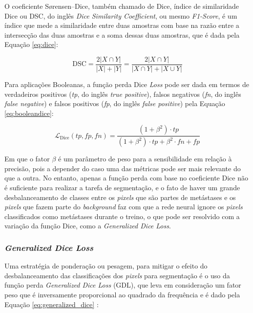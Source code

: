 O coeficiente S{\o}rensen–Dice, também chamado de Dice, índice de similaridade Dice ou DSC, do inglês \textit{Dice Similarity Coefficient}, ou mesmo \textit{F1-Score}, é um índice que mede a similaridade entre duas amostras com base na razão entre a intersecção das duas amostras e a soma dessas duas amostras, que é dada pela Equação \ref{eq:dice}:

\begin{equation}\label{eq:dice}
    \text{DSC} = \frac{2|X \cap Y|}{|X| + |Y|} = \frac{2|X \cap Y|}{|X \cap Y| + |X \cup Y|}
\end{equation}

Para aplicações Booleanas, a função perda Dice \textit{Loss} pode ser dada  em termos de verdadeiros positivos  (\textit{tp}, do inglês \textit{true positive}), falsos negativos (\textit{fn}, do inglês \textit{false negative}) e falsos positivos (\textit{fp}, do inglês \textit{false positive}) pela Equação \ref{eq:booleandice}:

\begin{equation}\label{eq:booleandice}
    \mathcal{L}_{\text{Dice}}(tp, fp, fn) = \frac{(1 + \beta^2) \cdot tp} {(1 + \beta^2) \cdot tp + \beta^2 \cdot fn + fp}
\end{equation}

Em que o fator $\beta$ é um parâmetro de peso para a sensibilidade em relação à precisão, pois a depender do caso uma das métricas pode ser mais relevante do que a outra. No entanto, apenas a função perda com base no coeficiente Dice não é suficiente para realizar a tarefa de segmentação, e o fato de haver um grande desbalanceamento de classes entre os \textit{pixels} que são partes de metástases e os \textit{pixels} que fazem parte do \textit{background} faz com que a rede neural ignore os \textit{pixels} classificados como metástases durante o treino, o que pode ser resolvido com a variação da função Dice, como a \textit{Generalized Dice Loss}.

\subsubsection{\textit{Generalized Dice Loss}}

Uma estratégia de ponderação ou pesagem, para mitigar o efeito do desbalanceamento das classificações dos \textit{pixels} para segmentação é o uso da função perda \textit{Generalized Dice Loss} (GDL), que leva em consideração um fator peso que é inversamente proporcional ao quadrado da frequência \cite{Sugino:2021} e é dado pela Equação \ref{eq:generalized_dice} \cite{Sudre:2017}:

